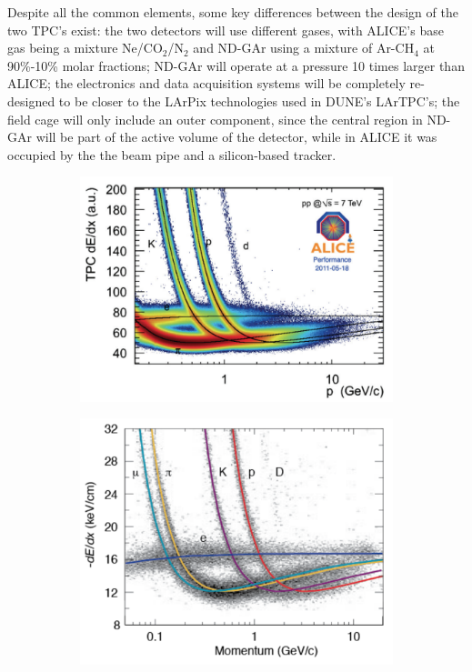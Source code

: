 Despite all the common elements, some key differences between the design of the two TPC's exist: the two detectors will use different gases, with ALICE's base gas being a mixture Ne/CO$_2$/N$_2$ and ND-GAr using a mixture of Ar-CH$_4$ at 90\%-10\% molar fractions; ND-GAr will operate at a pressure 10 times larger than ALICE; the electronics and data acquisition systems will be completely re-designed to be closer to the LArPix technologies used in DUNE's LArTPC's; the field cage will only include an outer component, since the central region in ND-GAr will be part of the active volume of the detector, while in ALICE it was occupied by the the beam pipe and a silicon-based tracker.
\begin{figure}[t]
     \centering
     \begin{subfigure}[b]{0.52\textwidth}
         \centering
         \includegraphics[width=\textwidth]{figures/ch3-DUNE/ALICE_TPC_dEdx_Lippmann_2012.png}
         \caption{}
         \label{fig:ALICEPID}
     \end{subfigure}
     \hfill
     \begin{subfigure}[b]{0.47\textwidth}
         \centering
         \includegraphics[width=\textwidth]{figures/ch3-DUNE/PEP4-TPC-80Ar-20CH4-8_5atm_dEdx.png}

\end{subfigure}
\end{figure}
